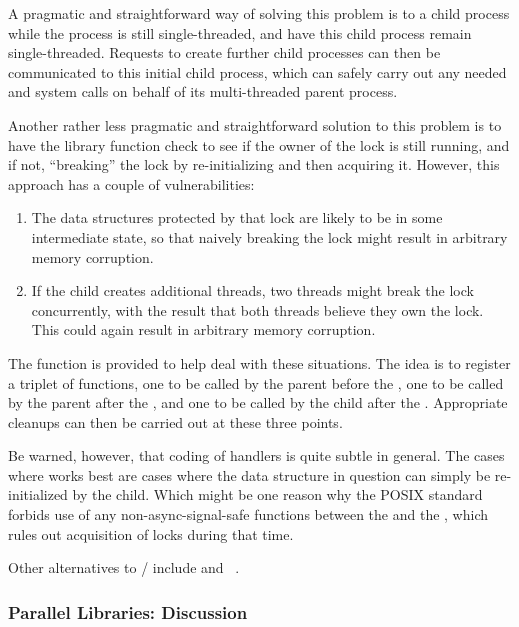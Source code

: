A pragmatic and straightforward way of solving this problem is
to  a child process while the process is still single-threaded,
and have this child process remain single-threaded.
Requests to create further child processes can then be communicated
to this initial child process, which can safely carry out any
needed  and  system calls on behalf of its
multi-threaded parent process.

Another rather less pragmatic and straightforward solution to this problem
is to have the library function check to see if the owner of the lock
is still running, and if not, ``breaking'' the lock by re-initializing
and then acquiring it.
However, this approach has a couple of vulnerabilities:

\begin{enumerate}
\item	The data structures protected by that lock are likely to
	be in some intermediate state, so that naively breaking the lock
	might result in arbitrary memory corruption.
\item	If the child creates additional threads, two threads might
	break the lock concurrently, with the result that both
	threads believe they own the lock.
	This could again result in arbitrary memory corruption.
\end{enumerate}

The  function is provided to help deal with these situations.
The idea is to register a triplet of functions, one to be called by the
parent before the , one to be called by the parent after the
, and one to be called by the child after the .
Appropriate cleanups can then be carried out at these three points.

Be warned, however, that coding of  handlers is
quite subtle in general.
The cases where  works best are cases where the
data structure in question can simply be re-initialized by the child.
Which might be one reason why the POSIX standard forbids use of any
non-async-signal-safe functions between the  and the
, which rules out acquisition of locks during that time.

Other alternatives to / include 
and ~\cite{JoshTriplett2022io_uring_spawn,JakeEdge2022io_uring_spawn}.

\subsubsection{Parallel Libraries:
				   Discussion}
\label{sec:locking:Parallel Libraries: Discussion}

